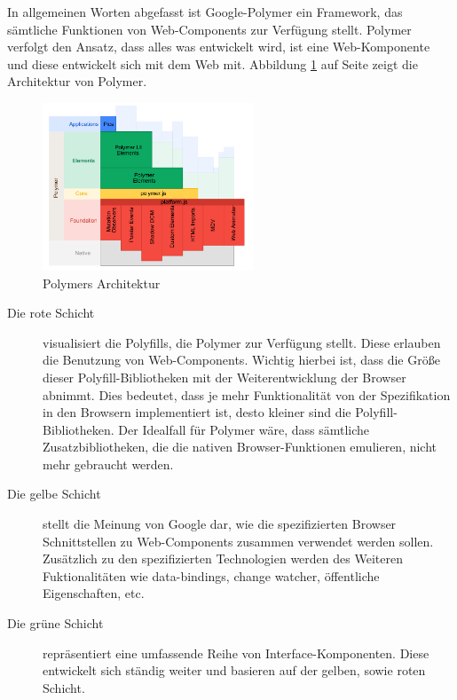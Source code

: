 
In allgemeinen Worten abgefasst ist Google-Polymer ein Framework, das sämtliche Funktionen von Web-Components zur Verfügung stellt. Polymer verfolgt den Ansatz, dass alles was entwickelt wird, ist eine Web-Komponente und diese entwickelt sich mit dem Web mit. Abbildung \ref{fig:3_polymer_architecture} auf Seite \pageref{fig:3_polymer_architecture} zeigt die Architektur von Polymer.


\begin{figure}[h]
\centering
\includegraphics[height=5.0cm]{images/polymer_architecture.png}
\caption[
Polymers Architektur, Urldate: 04.2014 \newline
\small\texttt{http://i.stack.imgur.com/Ksn6s.png}
]{Polymers Architektur}
\label{fig:3_polymer_architecture}
\end{figure}

\begin{description}
\item[Die rote Schicht] visualisiert die Polyfills, die Polymer zur Verfügung stellt. Diese erlauben die Benutzung von Web-Components. Wichtig hierbei ist, dass die Größe dieser Polyfill-Bibliotheken mit der Weiterentwicklung der Browser abnimmt. Dies bedeutet, dass je mehr Funktionalität von der Spezifikation in den Browsern implementiert ist, desto kleiner sind die Polyfill-Bibliotheken. Der Idealfall für Polymer wäre, dass sämtliche Zusatzbibliotheken, die die nativen Browser-Funktionen emulieren, nicht mehr gebraucht werden.
\item[Die gelbe Schicht] stellt die Meinung von Google dar, wie die spezifizierten Browser Schnittstellen zu Web-Components zusammen verwendet werden sollen. Zusätzlich zu den spezifizierten Technologien werden des Weiteren Fuktionalitäten wie \glqq data-bindings\grqq , \glqq change watcher\grqq , \glqq öffentliche Eigenschaften\grqq , etc.
\item[Die grüne Schicht] repräsentiert eine umfassende Reihe von Interface-Komponenten. Diese entwickelt sich ständig weiter und basieren auf der gelben, sowie roten Schicht.
\end{description}

